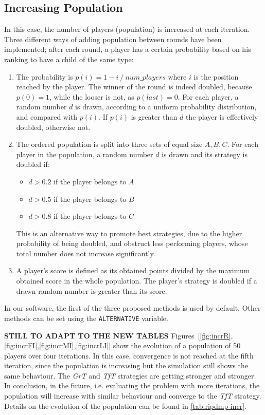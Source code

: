 \documentclass[journal,10pt,twoside]{IEEEtran}
\begin{document}
\subsection{Increasing Population}
In this case, the number of players (population) is increased at each iteration. Three different ways of adding population between rounds have been implemented; after each round, a player has a certain probability based on his ranking to have a child of the same type:
\begin{enumerate}
    \item The probability is $p(i)=1- i\ /\ num\_players$ where $i$ is the position reached by the player. The winner of the round is indeed doubled, because $p(0)=1$, while the looser is not, as $p(last)=0$.
    For each player, a random number $d$ is drawn, according to a uniform probability distribution, and compared with $p(i)$. If $p(i)$ is greater than $d$ the player is effectively doubled, otherwise not.
    \item The ordered population is split into three sets of equal size $A,B,C$. For each player in the population, a random number $d$ is drawn and its strategy is doubled if:
    \begin{itemize}
        \item $d>0.2$ if the player belongs to $A$
        \item $d>0.5$ if the player belongs to $B$
        \item $d>0.8$ if the player belongs to $C$
    \end{itemize}
    This is an alternative way to promote best strategies, due to the higher probability of being doubled, and obstruct less performing players, whose total number does not increase significantly.
    \item A player's score is defined as its obtained points divided by the maximum obtained score in the whole population. The player's strategy is doubled if a drawn random number is greater than its score.
\end{enumerate}

In our software, the first of the three proposed methods is used by default. Other methods can be set using the \texttt{ALTERNATIVE} variable.

\textbf{STILL TO ADAPT TO THE NEW TABLES}
Figures~[\ref{fig:incrR},\ref{fig:incrFI},\ref{fig:incrMI},\ref{fig:incrLI}] show the evolution of a population of 50 players over four iterations. In this case, convergence is not reached at the fifth iteration, since the population is increasing but the simulation still shows the same behaviour. The \textit{GrT} and \textit{TfT} strategies are getting stronger and stronger. In conclusion, in the future, i.e. evaluating the problem with more iterations, the population will increase with similar behaviour and converge to the \textit{TfT} strategy. Details on the evolution of the population can be found in \autoref{tab:ripdmp-incr}.
\end{document}

